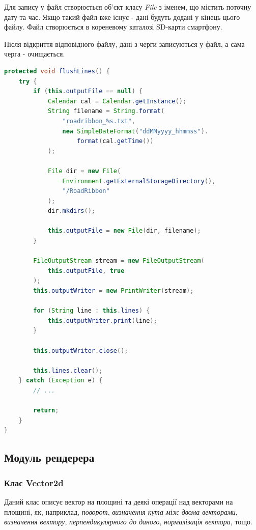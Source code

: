 \documentclass[simple,a4paper,14pt,ukrainian,utf8]{eskdtext}
\begin{document}
        	Для запису у файл створюється об’єкт класу \textit{File} з іменем, що містить поточну дату та час. Якщо такий файл вже існує - дані будуть додані у кінець цього файлу. Файл створюється в кореневому каталозі SD-карти смартфону.
        	
        	Після відкриття відповідного файлу, дані з черги записуються у файл, а сама черга - очищається.
        	
\begin{lstlisting}[language=Java]
protected void flushLines() {
    try {
        if (this.outputFile == null) {
            Calendar cal = Calendar.getInstance();
            String filename = String.format(
            	"roadribbon_%s.txt",
                new SimpleDateFormat("ddMMyyyy_hhmmss").
                	format(cal.getTime())
            );

            File dir = new File(
            	Environment.getExternalStorageDirectory(), 
            	"/RoadRibbon"
            );
            dir.mkdirs();

            this.outputFile = new File(dir, filename);
        }

        FileOutputStream stream = new FileOutputStream(
        	this.outputFile, true
        );
        this.outputWriter = new PrintWriter(stream);

        for (String line : this.lines) {
            this.outputWriter.print(line);
        }

        this.outputWriter.close();

        this.lines.clear();
    } catch (Exception e) {
        // ...

        return;
    }
}
\end{lstlisting}
        
     \subsection{Модуль рендерера}
     
     	\subsubsection{Клас Vector2d}
     	
     		Даний клас описує вектор на площині та деякі операції над векторами на площині, як, наприклад, \textit{поворот}, \textit{визначення кута між двома векторами}, \textit{визначення вектору}, \textit{перпендикулярного до даного}, \textit{нормалізація вектора}, тощо.
     	
\end{document}
